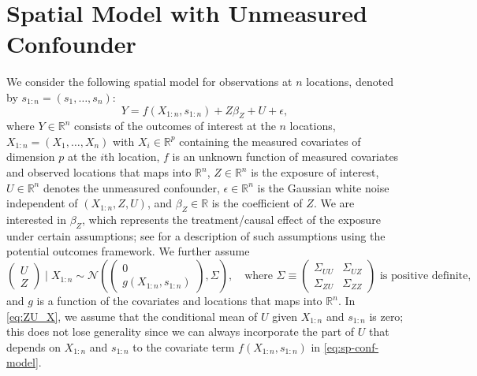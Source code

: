 \documentclass[11pt]{article}
\theoremstyle{definition}
\theoremstyle{remark}
\begin{document}
\section{Spatial Model with Unmeasured Confounder}\label{sec:model}
We consider the following spatial model for observations at $n$ locations, denoted by $s_{1:n} = (s_1,\ldots, s_n)$: 
\begin{equation}\label{eq:sp-conf-model}
 Y = f(X_{1:n}, s_{1:n}) + Z \beta_Z + U + \epsilon,
\end{equation}
where $Y \in \mathbb{R}^n$ consists of the outcomes of interest at the $n$ locations, $X_{1:n} = (X_1, \ldots, X_n)$ with $X_i\in \mathbb{R}^p$ containing the measured covariates of dimension $p$ at the $i$th location, $f $ is an unknown function of measured covariates and observed locations that maps into $\mathbb{R}^n$, $Z\in \mathbb{R}^n$ is the exposure of interest, $U \in \mathbb{R}^n$ denotes the unmeasured confounder, $\epsilon \in \mathbb{R}^n$ is the Gaussian white noise independent of $(X_{1:n}, Z, U)$, 
and $\beta_Z \in \mathbb{R}$ is the coefficient of  $Z$.
We are interested in $\beta_Z$, which represents the treatment/causal effect of the exposure under certain assumptions; see \citet{guan2023spectral} for a description of such assumptions using the potential outcomes framework. 
We 
further assume
\begin{equation}\label{eq:ZU_X}
    \begin{pmatrix}
        U\\
        Z
    \end{pmatrix}
    \mid  X_{1:n} 
    \sim \mathcal{N}
    \left(  
    \begin{pmatrix}
        0\\
          g(X_{1:n}, s_{1:n})
    \end{pmatrix}, 
    \Sigma
    \right),  
    \quad 
    \text{where }
    \Sigma \equiv
    \begin{pmatrix}
        \Sigma_{UU} & \Sigma_{UZ}\\
        \Sigma_{ZU} & \Sigma_{ZZ}
    \end{pmatrix}
    \text{ is positive definite,}
\end{equation}
and $g$ is a function of the covariates and locations that maps into $\mathbb{R}^n$.
In \eqref{eq:ZU_X}, 
we assume that the conditional mean of $U$ given $X_{1:n}$ and $s_{1:n}$ is zero; this does not lose generality since we can always incorporate the part of $U$ that depends on $X_{1:n}$ and $s_{1:n}$
to the covariate term $f(X_{1:n}, s_{1:n})$ in \eqref{eq:sp-conf-model}. 
\end{document}
